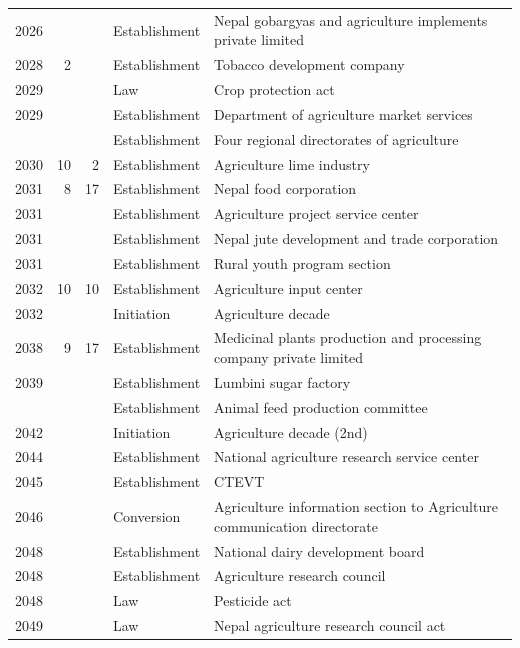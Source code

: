 \documentclass[
  openany]{book}
\begin{document}
\begin{table}[H]
\begin{tabular}[t]{rrrll}
2026 &  &  & Establishment & Nepal gobargyas and agriculture implements private limited\\
\rowcolor{gray!6}  2028 & 2 &  & Establishment & Tobacco development company\\
2029 &  &  & Law & Crop protection act\\
\rowcolor{gray!6}  2029 &  &  & Establishment & Department of agriculture market services\\
\addlinespace
2029 &  &  & Establishment & Four regional directorates of agriculture\\
\rowcolor{gray!6}  2030 & 10 & 2 & Establishment & Agriculture lime industry\\
2031 & 8 & 17 & Establishment & Nepal food corporation\\
\rowcolor{gray!6}  2031 &  &  & Establishment & Agriculture project service center\\
2031 &  &  & Establishment & Nepal jute development and trade corporation\\
\addlinespace
\rowcolor{gray!6}  2031 &  &  & Establishment & Rural youth program section\\
2032 & 10 & 10 & Establishment & Agriculture input center\\
\rowcolor{gray!6}  2032 &  &  & Initiation & Agriculture decade\\
2038 & 9 & 17 & Establishment & Medicinal plants production and processing company private limited\\
\rowcolor{gray!6}  2039 &  &  & Establishment & Lumbini sugar factory\\
\addlinespace
2041 &  &  & Establishment & Animal feed production committee\\
\rowcolor{gray!6}  2042 &  &  & Initiation & Agriculture decade (2nd)\\
2044 &  &  & Establishment & National agriculture research service center\\
\rowcolor{gray!6}  2045 &  &  & Establishment & CTEVT\\
2046 &  &  & Conversion & Agriculture information section to Agriculture communication directorate\\
\addlinespace
\rowcolor{gray!6}  2048 &  &  & Establishment & National dairy development board\\
2048 &  &  & Establishment & Agriculture research council\\
\rowcolor{gray!6}  2048 &  &  & Law & Pesticide \vphantom{1} act\\
2049 &  &  & Law & Nepal agriculture research council act\\

\end{tabular}
\end{table}
\end{document}
